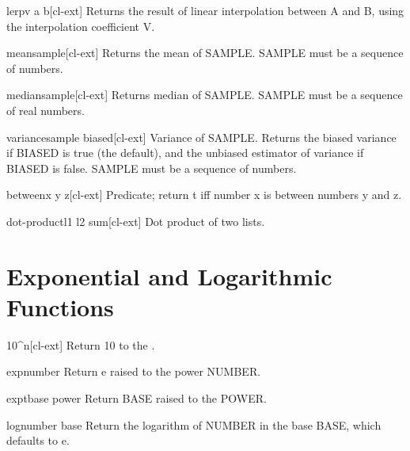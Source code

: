 \documentclass[10pt,english]{book}
\begin{document}
\begin{function}{lerp}{v a b}[cl-ext]
  Returns the result of linear interpolation between A and B, using the
interpolation coefficient V.
\end{function}

\begin{function}{mean}{sample}[cl-ext]
  Returns the mean of SAMPLE. SAMPLE must be a sequence of numbers.
\end{function}

\begin{function}{median}{sample}[cl-ext]
  Returns median of SAMPLE. SAMPLE must be a sequence of real numbers.
\end{function}

\begin{function}{variance}{sample \key biased}[cl-ext]
  Variance of SAMPLE. Returns the biased variance if BIASED is true (the default),
and the unbiased estimator of variance if BIASED is false. SAMPLE must be a
sequence of numbers.
\end{function}

\begin{function}{between}{x y z}[cl-ext]
  Predicate; return t iff number x is between numbers y and z.
\end{function}

\begin{function}{dot-product}{l1 l2 \aux sum}[cl-ext]
  Dot product of two lists.
\end{function}

\section{Exponential and Logarithmic Functions}
\label{sec:expon-logar-funct}

\begin{function}[10caret]{10\^{}}{n}[cl-ext]
  Return 10 to the .
\end{function}

\begin{function}{exp}{number}
  Return e raised to the power NUMBER.
\end{function}

\begin{function}{expt}{base power}
  Return BASE raised to the POWER.
\end{function}

\begin{function}{log}{number \op base}
  Return the logarithm of NUMBER in the base BASE, which defaults to e.
\end{function}
\end{document}
